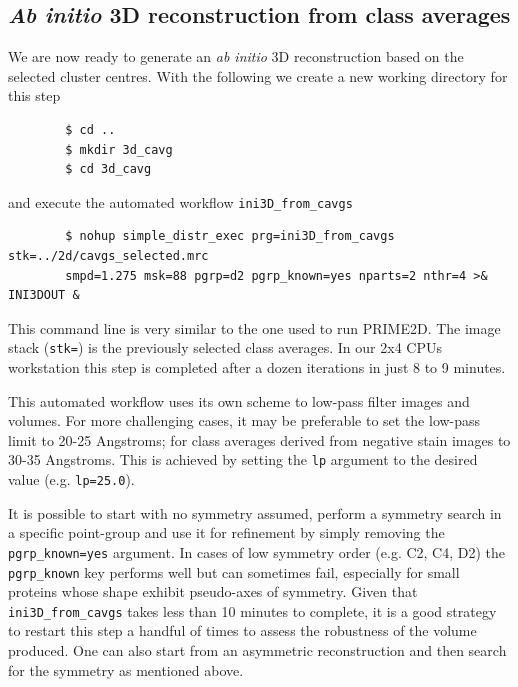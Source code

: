 \documentclass[a4paper,11pt]{article}
\begin{document}
\subsection{\textit{Ab initio} 3D reconstruction from class averages}

We are now ready to generate an \textit{ab initio} 3D reconstruction based on the selected cluster centres. With the following we create a new working directory for this step
\begin{verbatim}
        $ cd ..
        $ mkdir 3d_cavg
        $ cd 3d_cavg
\end{verbatim}
and execute the automated workflow \texttt{ini3D\_from\_cavgs}
\begin{verbatim}
        $ nohup simple_distr_exec prg=ini3D_from_cavgs stk=../2d/cavgs_selected.mrc 
        smpd=1.275 msk=88 pgrp=d2 pgrp_known=yes nparts=2 nthr=4 >& INI3DOUT &
\end{verbatim}
This command line is very similar to the one used to run PRIME2D. The image stack (\texttt{stk=}) is the previously selected class averages. In our 2x4 CPUs workstation this step is completed after a dozen iterations in just 8 to 9 minutes.

This automated workflow uses its own scheme to low-pass filter images and volumes. For more challenging cases, it may be preferable to set the low-pass limit to 20-25 Angstroms; for class averages derived from negative stain images to 30-35 Angstroms. This is achieved by setting the \texttt{lp} argument to the desired value (e.g. \texttt{lp=25.0}).

It is possible to start with no symmetry assumed, perform a symmetry search in a specific point-group and use it for refinement by simply removing the \texttt{pgrp\_known=yes} argument. In cases of low symmetry order (e.g. C2, C4, D2) the \texttt{pgrp\_known} key performs well but can sometimes fail, especially for small proteins whose shape exhibit pseudo-axes of symmetry. Given that \texttt{ini3D\_from\_cavgs} takes less than 10 minutes to complete, it is a good strategy to restart this step a handful of times to assess the robustness of the volume produced. One can also start from an asymmetric reconstruction and then search for the symmetry as mentioned above.
\end{document}
